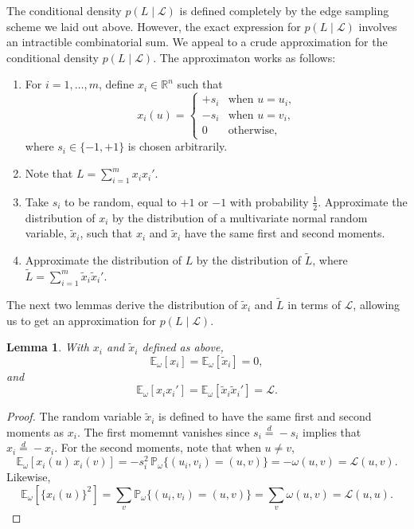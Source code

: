\documentclass[12pt]{article}
\newcommand{\reals}{\mathbb{R}}
\newcommand{\prob}{\mathbb{P}}
\newcommand{\E}{\mathbb{E}}
\theoremstyle{plain}
\newtheorem{lemma}[theorem]{Lemma}
\begin{document}
The conditional density $p(L \mid \mathcal{L})$ is defined completely
by the edge sampling scheme we laid out above.   However, the exact
expression for $p(L \mid \mathcal{L})$ involves an intractible
combinatorial sum.  We appeal to a crude approximation for the conditional
density $p(L \mid \mathcal{L})$.  The approximaton works as follows:
\begin{enumerate}
\item For $i = 1, \dotsc, m$, define $x_i \in \reals^n$ such that
  \[
    x_i(u)
      =
      \begin{cases}
        +s_i &\text{when $u = u_i$,} \\
        -s_i &\text{when $u = v_i$,} \\
        0 &\text{otherwise,}
      \end{cases}
  \]
  where $s_i \in \{ -1, +1 \}$ is chosen arbitrarily.
\item Note that $L = \sum_{i=1}^m x_i x_i'$.
\item Take $s_i$ to be random, equal to $+1$ or $-1$ with probability
  $\tfrac{1}{2}$.  Approximate the distribution of $x_i$ by the
  distribution of a multivariate normal random variable, $\tilde x_i$,
  such that $x_i$ and $\tilde x_i$ have the same first and second
  moments.
\item Approximate the distribution of $L$ by the distribution of $\tilde L$, where
  \(
    \tilde L = \sum_{i=1}^m \tilde x_i \tilde x_i'.
  \)
\end{enumerate}

\noindent
The next two lemmas derive the distribution of $\tilde x_i$ and
$\tilde L$ in terms of $\mathcal{L}$, allowing us to get an
approximation for $p(L \mid \mathcal{L})$.

\begin{lemma}
  With $x_i$ and $\tilde x_i$ defined as above,
  \[
    \E_\omega[ x_i ] = \E_\omega[ \tilde x_i ] = 0,
  \]
  and
  \[
    \E_\omega[ x_i x_i' ] = \E_\omega [ \tilde x_i \tilde x_i' ] = \mathcal{L}.
  \]
\end{lemma}
\begin{proof}
  The random variable $\tilde x_i$ is defined to have the same first
  and second moments as $x_i$.
  The first momemnt vanishes since $s_i \overset{d}{=} -s_i$ implies
  that $x_i \overset{d}{=} -x_i$.  For the second moments, note that
  when $u \neq v$, 
  \[
    \E_\omega[x_i(u) \, x_i(v)]
      = -s_i^2 \, \prob_\omega\{ (u_i,v_i) = (u,v) \}  = -\omega(u,v)
      = \mathcal{L}(u,v).
  \]
  Likewise,
  \[
    \E_\omega[\{x_i(u)\}^2]
      = \sum_{v} \prob_\omega\{ (u_i,v_i) = (u,v) \}
      = \sum_{v} \omega(u,v)
      = \mathcal{L}(u,u).
  \]
\end{proof}
\end{document}
